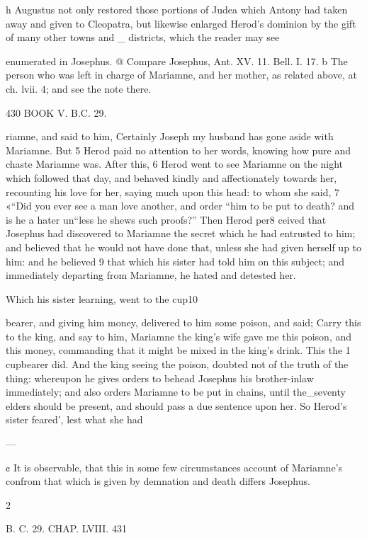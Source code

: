 h Augustus not only restored those portions of Judea which Antony had taken away and given to Cleopatra, but likewise enlarged Herod’s dominion by the gift of many other towns and _ districts, which the reader may see 

enumerated in Josephus. 
@ Compare Josephus, Ant. XV. 11. Bell. I. 17. 
b The person who was left in charge of Mariamne, and her mother, as related above, at ch. lvii. 4; and see the note there. 

430 BOOK V. B.C. 29. 

riamne, and said to him, Certainly Joseph my husband has gone aside with Mariamne. But 5 Herod paid no attention to her words, knowing how pure and chaste Mariamne was. After this, 6 Herod went to see Mariamne on the night which followed that day, and behaved kindly and affectionately towards her, recounting his love for her, saying much upon this head: to whom she said, 7 «“Did you ever see a man love another, and order “him to be put to death? and is he a hater un“less he shews such proofs?” Then Herod per8 ceived that Josephus had discovered to Mariamne the secret which he had entrusted to him; and believed that he would not have done that, unless she had given herself up to him: and he believed 9 that which his sister had told him on this subject; and immediately departing from Mariamne, he hated and detested her. 

Which his sister learning, went to the cup10 

bearer, and giving him money, delivered to him some poison, and said; Carry this to the king, and say to him, Mariamne the king’s wife gave me this poison, and this money, commanding that it might be mixed in the king’s drink. This the 1 cupbearer did. And the king seeing the poison, doubted not of the truth of the thing: whereupon he gives orders to behead Josephus his brother-inlaw immediately; and also orders Mariamne to be put in chains, until the_seventy elders should be present, and should pass a due sentence upon her. 
So Herod’s sister feared’, lest what she had 

— 

¢ It is observable, that this in some few circumstances account of Mariamne’s confrom that which is given by demnation and death differs Josephus. 

2 

B. C. 29. CHAP. LVIII. 431 

